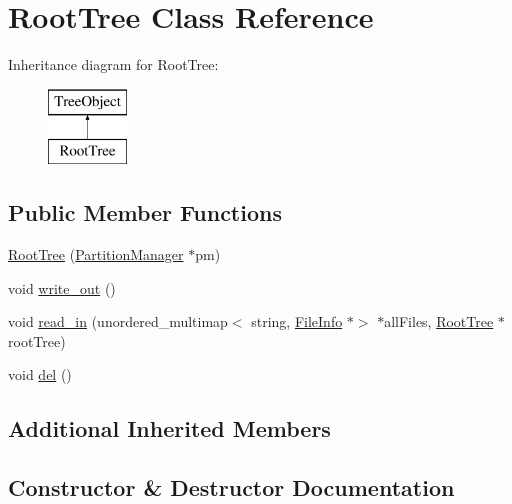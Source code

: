 \hypertarget{classRootTree}{}\section{Root\+Tree Class Reference}
\label{classRootTree}
Inheritance diagram for Root\+Tree\+:\begin{figure}[H]
\begin{center}
\leavevmode
\includegraphics[height=2.000000cm]{d4/d10/classRootTree}
\end{center}
\end{figure}
\subsection*{Public Member Functions}
\begin{DoxyCompactItemize}
\item 
\mbox{\hyperlink{classRootTree_a491c0374c9024faf1e1c8045f21a4cad}{Root\+Tree}} (\mbox{\hyperlink{classPartitionManager}{Partition\+Manager}} $\ast$pm)
\item 
void \mbox{\hyperlink{classRootTree_ad6eefe5d46ee37b3725799897a78c2dd}{write\+\_\+out}} ()
\item 
void \mbox{\hyperlink{classRootTree_a658eed78be67e890de2283af960dc532}{read\+\_\+in}} (unordered\+\_\+multimap$<$ string, \mbox{\hyperlink{classFileInfo}{File\+Info}} $\ast$$>$ $\ast$all\+Files, \mbox{\hyperlink{classRootTree}{Root\+Tree}} $\ast$root\+Tree)
\item 
void \mbox{\hyperlink{classRootTree_ac431dc04b767fc66791c251d8173650d}{del}} ()
\end{DoxyCompactItemize}
\subsection*{Additional Inherited Members}


\subsection{Constructor \& Destructor Documentation}
\mbox{\label{classRootTree_a491c0374c9024faf1e1c8045f21a4cad}} 
